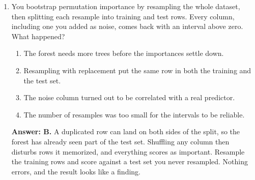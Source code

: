 \documentclass[11pt]{article}
\begin{document}
\begin{enumerate}[itemsep=14pt]
\begin{enumerate}[label=\Alph*., itemsep=1pt, topsep=3pt]
  \item Nothing, as long as the building is recorded as a column in the data.
  \item The interval comes out too narrow, because the rows carry less information than their count.
  \item The interval comes out too wide, because buildings add variation between resamples.
  \item The resampling fails, because the same listing can be drawn more than once.
\end{enumerate}

\vspace{2pt}
\textbf{Answer: B.} Listings in one building resemble each other, so 20 of them are not 20 independent pieces of evidence. Resampling rows assumes they are, and the resulting spread is smaller than the truth. Resampling whole buildings instead is the usual repair.
\vspace{4pt}

\item You bootstrap permutation importance by resampling the whole dataset, then splitting each resample into training and test rows. Every column, including one you added as noise, comes back with an interval above zero. What happened?

\begin{enumerate}[label=\Alph*., itemsep=1pt, topsep=3pt]
  \item The forest needs more trees before the importances settle down.
  \item Resampling with replacement put the same row in both the training and the test set.
  \item The noise column turned out to be correlated with a real predictor.
  \item The number of resamples was too small for the intervals to be reliable.
\end{enumerate}

\vspace{2pt}
\textbf{Answer: B.} A duplicated row can land on both sides of the split, so the forest has already seen part of the test set. Shuffling any column then disturbs rows it memorized, and everything scores as important. Resample the training rows and score against a test set you never resampled. Nothing errors, and the result looks like a finding.
\vspace{4pt}

\end{enumerate}
\end{document}
